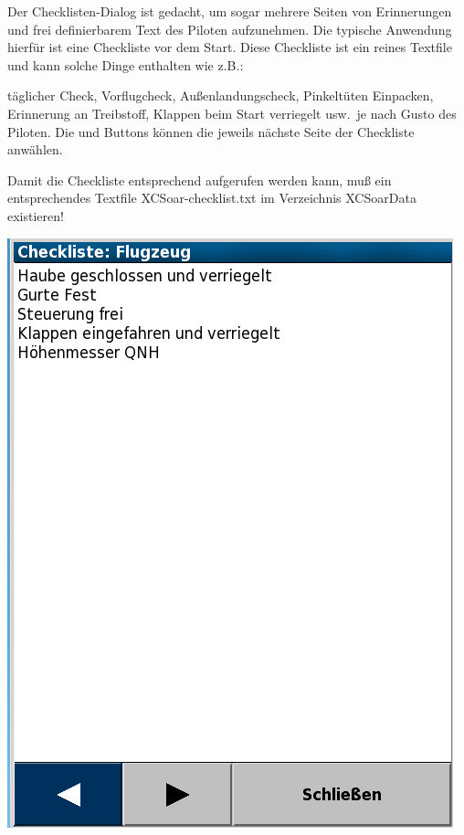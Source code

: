 
Der Checklisten-Dialog ist gedacht, um sogar mehrere Seiten von Erinnerungen und frei definierbarem Text des Piloten aufzunehmen.
Die typische Anwendung hierfür ist eine Checkliste vor dem Start. Diese Checkliste ist ein reines Textfile und kann solche Dinge enthalten wie z.B.:\


täglicher Check, Vorflugcheck, Außenlandungscheck, Pinkeltüten Einpacken, Erinnerung an Treibstoff, Klappen beim Start verriegelt usw.\ je nach Gusto des Piloten.
Die  \button{$<$} und \button{$>$} Buttons können die jeweils nächste Seite der Checkliste anwählen.

Damit die Checkliste entsprechend aufgerufen werden kann, muß ein entsprechendes Textfile \textsf{\textsf{XCSoar}-checklist.txt} im Verzeichnis \textsf{\textsf{XCSoar}Data} existieren!


\begin{center}
\includegraphics[angle=0,width=0.8\linewidth,keepaspectratio='true']{figures/checklist.png}
\end{center}

